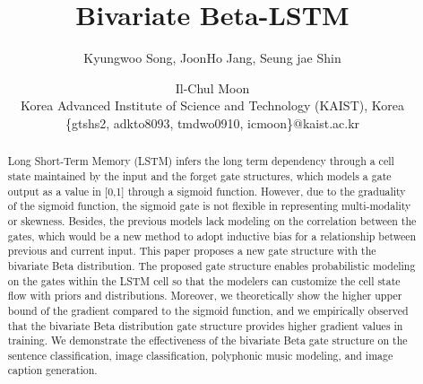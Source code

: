 \documentclass[letterpaper]{article} %
\begin{document}
\title{Bivariate Beta-LSTM}
\author{Kyungwoo Song, JoonHo Jang, Seung jae Shin \and Il-Chul Moon \\ 
	Korea Advanced Institute of Science and Technology (KAIST), Korea \\
	\{gtshs2, adkto8093, tmdwo0910, icmoon\}@kaist.ac.kr}
\maketitle

\begin{abstract}
Long Short-Term Memory (LSTM) infers the long term dependency through a cell state maintained by the input and the forget gate structures, which models a gate output as a value in [0,1] through a sigmoid function. However, due to the graduality of the sigmoid function, the sigmoid gate is not flexible in representing multi-modality or skewness. Besides, the previous models lack modeling on the correlation between the gates, which would be a new method to adopt inductive bias for a relationship between previous and current input. This paper proposes a new gate structure with the bivariate Beta distribution. The proposed gate structure enables probabilistic modeling on the gates within the LSTM cell so that the modelers can customize the cell state flow with priors and distributions. Moreover, we theoretically show the higher upper bound of the gradient compared to the sigmoid function, and we empirically observed that the bivariate Beta distribution gate structure provides higher gradient values in training. We demonstrate the effectiveness of the bivariate Beta gate structure on the sentence classification, image classification, polyphonic music modeling, and image caption generation.
\end{abstract}
\end{document}
